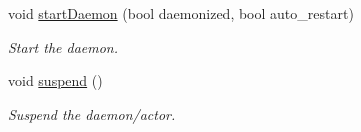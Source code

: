 \begin{DoxyCompactItemize}
void \hyperlink{classwrench_1_1_s4_u___daemon_a0c4d09ad3e03735a5de6557c5f995ea2}{start\+Daemon} (bool daemonized, bool auto\+\_\+restart)
\begin{DoxyCompactList}\small\item\em Start the daemon. \end{DoxyCompactList}\item 
\mbox{\label{classwrench_1_1_s4_u___daemon_a2da11681f010d1c7a668257a6f0e1104}} 
void \hyperlink{classwrench_1_1_s4_u___daemon_a2da11681f010d1c7a668257a6f0e1104}{suspend} ()
\begin{DoxyCompactList}\small\item\em Suspend the daemon/actor. \end{DoxyCompactList}\end{DoxyCompactItemize}
